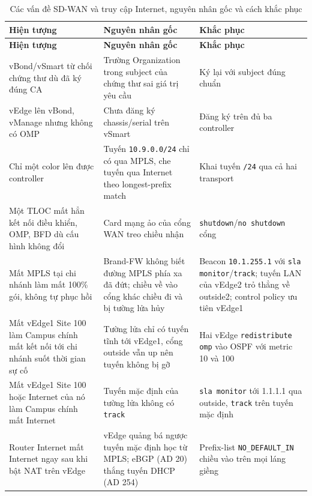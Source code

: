 \begingroup
\small
\begin{longtable}{|L{3.4cm}|L{5.4cm}|L{4.7cm}|}
    \caption[Các vấn đề SD-WAN, nguyên nhân gốc và cách khắc phục]{Các vấn đề SD-WAN và truy cập Internet, nguyên nhân gốc và cách khắc phục}\label{tab:loi_sdwan} \\
    \hline
    \textbf{Hiện tượng} & \textbf{Nguyên nhân gốc} & \textbf{Khắc phục} \\
    \hline
    \endfirsthead
    \hline
    \textbf{Hiện tượng} & \textbf{Nguyên nhân gốc} & \textbf{Khắc phục} \\
    \hline
    \endhead
    \hline
    \endfoot
    vBond/vSmart từ chối chứng thư dù đã ký đúng CA & Trường Organization trong subject của chứng thư sai giá trị yêu cầu & Ký lại với subject đúng chuẩn \\
    \hline
    vEdge lên vBond, vManage nhưng không có OMP & Chưa đăng ký chassis/serial trên vSmart & Đăng ký trên đủ ba controller \\
    \hline
    Chỉ một color lên được controller & Tuyến \texttt{10.9.0.0/24} chỉ có qua MPLS, che tuyến qua Internet theo longest-prefix match & Khai tuyến \texttt{/24} qua cả hai transport \\
    \hline
    Một TLOC mất hẳn kết nối điều khiển, OMP, BFD dù cấu hình không đổi & Card mạng ảo của cổng WAN treo chiều nhận & \texttt{shutdown}/\texttt{no shutdown} cổng \\
    \hline
    Mất MPLS tại chi nhánh làm mất 100\% gói, không tự phục hồi & Brand-FW không biết đường MPLS phía xa đã đứt; chiều về vào cổng khác chiều đi và bị tường lửa hủy & Beacon \texttt{10.1.255.1} với \texttt{sla monitor}/\texttt{track}; tuyến LAN của vEdge2 trỏ thẳng về outside2; control policy ưu tiên vEdge1 \\
    \hline
    Mất vEdge1 Site 100 làm Campus chính mất kết nối tới chi nhánh suốt thời gian sự cố & Tường lửa chỉ có tuyến tĩnh tới vEdge1, cổng outside vẫn up nên tuyến không bị gỡ & Hai vEdge \texttt{redistribute omp} vào OSPF với metric 10 và 100 \\
    \hline
    Mất vEdge1 Site 100 hoặc Internet của nó làm Campus chính mất Internet & Tuyến mặc định của tường lửa không có \texttt{track} & \texttt{sla monitor} tới 1.1.1.1 qua outside, \texttt{track} trên tuyến mặc định \\
    \hline
    Router Internet mất Internet ngay sau khi bật NAT trên vEdge & vEdge quảng bá ngược tuyến mặc định học từ MPLS; eBGP (AD 20) thắng tuyến DHCP (AD 254) & Prefix-list \texttt{NO\_DEFAULT\_IN} chiều vào trên mọi láng giềng \\

\end{longtable}
